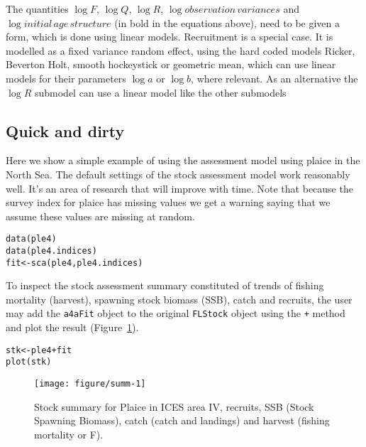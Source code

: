 \documentclass[a4paper,english,10pt]{article}\usepackage[]{graphicx}\usepackage[]{color}
\makeatletter
\def\maxwidth{ %
  \ifdim\Gin@nat@width>\linewidth
    \linewidth
  \else
    \Gin@nat@width
  \fi
}
\newcommand{\hlopt}[1]{\textcolor[rgb]{0.2,0.2,0.2}{#1}}%
\newcommand{\hlstd}[1]{\textcolor[rgb]{0,0,0}{#1}}%
\newcommand{\hlkwb}[1]{\textcolor[rgb]{0.361,0.506,0.596}{#1}}%
\newcommand{\hlkwd}[1]{\textcolor[rgb]{0.361,0.506,0.596}{#1}}%
\newenvironment{kframe}{%
 \def\at@end@of@kframe{}%
 \ifinner\ifhmode%
  \def\at@end@of@kframe{\end{minipage}}%
  \begin{minipage}{\columnwidth}%
 \fi\fi%
 \def\FrameCommand##1{\hskip\@totalleftmargin \hskip-\fboxsep
 \colorbox{shadecolor}{##1}\hskip-\fboxsep
     \hskip-\linewidth \hskip-\@totalleftmargin \hskip\columnwidth}%
 \MakeFramed {\advance\hsize-\width
   \@totalleftmargin\z@ \linewidth\hsize
   \@setminipage}}%
 {\par\unskip\endMakeFramed%
 \at@end@of@kframe}
\newenvironment{knitrout}{}{} %
\newcommand{\code}[1]{{\texttt{#1}}}
\makeatother
\begin{document}
The quantities $\log{F}$, $\log{Q}$, $\log{R}$, $\log{observation\,variances}$ and $\log{ initial\,age\,structure}$ (in bold in the equations above), need to be given a form, which is done using linear models. Recruitment is a special case. It is modelled as a fixed variance random effect, using the hard coded models Ricker, Beverton Holt, smooth hockeystick or geometric mean, which can use linear models for their parameters $\log{a}$ or $\log{b}$, where relevant. As an alternative the $\log{R}$ submodel can use a linear model like the other submodels 

\subsection{Quick and dirty}

Here we show a simple example of using the assessment model using plaice in the North Sea. The default settings of the stock assessment model work reasonably well. It's an area of research that will improve with time. Note that because the survey index for plaice has missing values we get a warning saying that we assume these values are missing at random.

\begin{knitrout}
\color{fgcolor}\begin{kframe}
\begin{alltt}
\hlkwd{data}\hlstd{(ple4)}
\hlkwd{data}\hlstd{(ple4.indices)}
\hlstd{fit} \hlkwb{<-} \hlkwd{sca}\hlstd{(ple4, ple4.indices)}
\end{alltt}
\end{kframe}
\end{knitrout}

To inspect the stock assessment summary constituted of trends of fishing mortality (harvest), spawning stock biomass (SSB), catch and recruits, the user may add the \code{a4aFit} object to the original \code{FLStock} object using the \code{+} method and plot the result (Figure~\ref{fig:summ}).

\begin{knitrout}
\color{fgcolor}\begin{kframe}
\begin{alltt}
\hlstd{stk} \hlkwb{<-} \hlstd{ple4} \hlopt{+} \hlstd{fit}
\hlkwd{plot}\hlstd{(stk)}
\end{alltt}
\end{kframe}\begin{figure}[H]

{\centering \texttt{[image: figure/summ-1]} 

}

\caption[Stock summary for Plaice in ICES area IV, recruits, SSB (Stock Spawning Biomass), catch (catch and landings) and harvest (fishing mortality or F)]{Stock summary for Plaice in ICES area IV, recruits, SSB (Stock Spawning Biomass), catch (catch and landings) and harvest (fishing mortality or F).}\label{fig:summ}
\end{figure}


\end{knitrout}
\end{document}
